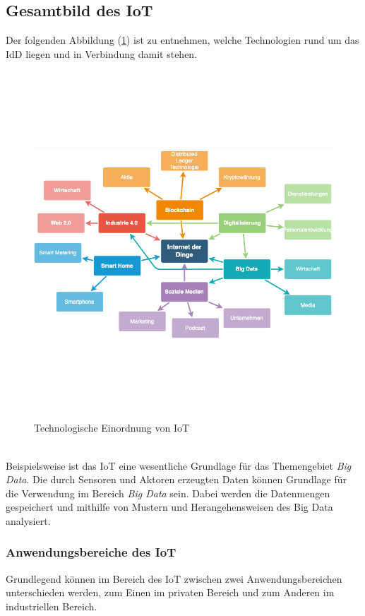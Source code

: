     \subsection*{Gesamtbild des \acl{IoT}}
        Der folgenden Abbildung (\ref{pic:mindmap_IoT}) ist zu entnehmen, welche Technologien rund um das \acl{IdD} liegen und in Verbindung damit stehen. 
        \begin{figure}[hbt!]
            \centering
            \includegraphics[width=13cm,height=13cm,keepaspectratio]{images/IoT-Mind_Map.png}
            \caption{Technologische Einordnung von IoT \cite{iotmindmap2018}}
            \label{pic:mindmap_IoT}
        \end{figure}
        \\
        \pagebreak
        Beispielsweise ist das \acs{IoT} eine wesentliche Grundlage für das Themengebiet \textit{Big Data}. Die durch Sensoren und Aktoren erzeugten Daten 
        können Grundlage für die Verwendung im Bereich \textit{Big Data} sein. Dabei werden die Datenmengen gespeichert und mithilfe von Mustern 
        und Herangehensweisen des Big Data analysiert. 

    \subsubsection*{Anwendungsbereiche des \acs{IoT}}
        Grundlegend können im Bereich des \acl{IoT} zwischen zwei Anwendungsbereichen unterschieden werden, zum Einen im privaten Bereich und zum 
        Anderen im industriellen Bereich. %

